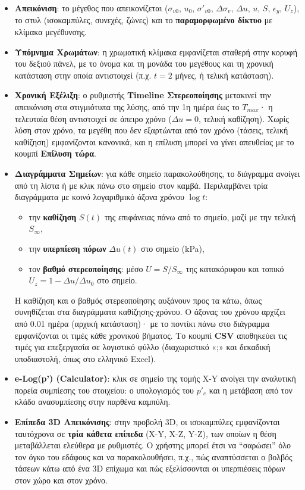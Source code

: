\documentclass[11pt,a4paper]{article}
\begin{document}
\begin{itemize}
  \item \textbf{Απεικόνιση}: το μέγεθος που απεικονίζεται ($\sigma_{v0}$, $u_0$, $\sigma'_{v0}$, $\Delta\sigma_v$, $\Delta u$, $u$, $S$, $\epsilon_y$, $U_z$), το στυλ (ισοκαμπύλες, συνεχές, ζώνες) και το \textbf{παραμορφωμένο δίκτυο} με κλίμακα μεγέθυνσης.
  \item \textbf{Υπόμνημα Χρωμάτων}: η χρωματική κλίμακα εμφανίζεται σταθερή στην κορυφή του δεξιού πάνελ, με το όνομα και τη μονάδα του μεγέθους και τη χρονική κατάσταση στην οποία αντιστοιχεί (π.χ. $t = 2$ μήνες, ή τελική κατάσταση).
  \item \textbf{Χρονική Εξέλιξη}: ο ρυθμιστής \textbf{Timeline Στερεοποίησης} μετακινεί την απεικόνιση στα στιγμιότυπα της λύσης, από την 1η ημέρα έως το $T_{max}$· η τελευταία θέση αντιστοιχεί σε άπειρο χρόνο ($\Delta u = 0$, τελική καθίζηση). Χωρίς λύση στον χρόνο, τα μεγέθη που δεν εξαρτώνται από τον χρόνο (τάσεις, τελική καθίζηση) εμφανίζονται κανονικά, και η επίλυση μπορεί να γίνει απευθείας με το κουμπί \textbf{Επίλυση τώρα}.
  \item \textbf{Διαγράμματα Σημείων}: για κάθε σημείο παρακολούθησης, το διάγραμμα ανοίγει από τη λίστα ή με κλικ πάνω στο σημείο στον καμβά. Περιλαμβάνει τρία διαγράμματα με κοινό λογαριθμικό άξονα χρόνου $\log t$:
  \begin{itemize}
    \item την \textbf{καθίζηση} $S(t)$ της επιφάνειας πάνω από το σημείο, μαζί με την τελική $S_\infty$,
    \item την \textbf{υπερπίεση πόρων} $\Delta u(t)$ στο σημείο (kPa),
    \item τον \textbf{βαθμό στερεοποίησης}: μέσο $U = S/S_\infty$ της κατακόρυφου και τοπικό $U_z = 1 - \Delta u/\Delta u_0$ στο σημείο.
  \end{itemize}
  Η καθίζηση και ο βαθμός στερεοποίησης αυξάνουν προς τα κάτω, όπως συνηθίζεται στα διαγράμματα καθίζησης-χρόνου. Ο άξονας του χρόνου αρχίζει από 0.01 ημέρα (αρχική κατάσταση)· με το ποντίκι πάνω στο διάγραμμα εμφανίζονται οι τιμές κάθε χρονικού βήματος. Το κουμπί \textbf{CSV} αποθηκεύει τις τιμές για επεξεργασία σε λογιστικό φύλλο (διαχωριστικό «;» και δεκαδική υποδιαστολή, όπως στο ελληνικό Excel).
  \item \textbf{e-Log(p') (Calculator)}: κλικ σε σημείο της τομής X-Y ανοίγει την αναλυτική πορεία συμπίεσης του στοιχείου: ο υπολογισμός του $p'_c$ και η μετάβαση από τον κλάδο ανασυμπίεσης στην παρθένα καμπύλη.
  \item \textbf{Επίπεδα 3D Απεικόνισης}: στην προβολή 3D, οι ισοκαμπύλες εμφανίζονται ταυτόχρονα σε \textbf{τρία κάθετα επίπεδα} (X-Y, X-Z, Y-Z), των οποίων η θέση μεταβάλλεται ελεύθερα με ρυθμιστές. Ο χρήστης μπορεί έτσι να ``σαρώσει'' όλο τον όγκο του εδάφους και να παρακολουθήσει, π.χ., πώς αναπτύσσεται ο βολβός τάσεων κάτω από ένα 3D επίχωμα και πώς εξελίσσονται οι υπερπιέσεις πόρων στον χώρο και στον χρόνο.
\end{itemize}
\end{document}
